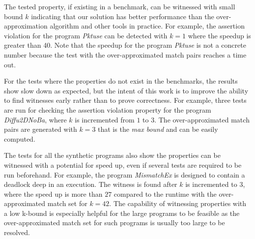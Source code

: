 The tested property, if existing in a benchmark, can be witnessed with small bound $k$ indicating that our solution has better performance than the over-approximation algorithm and other tools in practice. 
For example, the assertion violation for the program \textit{Pktuse} can be detected with $k=1$ where the speedup is greater than 40. Note that the speedup for the program \textit{Pktuse} is not a concrete number because the test with the over-approximated match pairs reaches a time out.


For the tests where the properties do not exist in the benchmarks, the results show slow down as expected, but the intent of this work is to improve the ability to find witnesses early rather than to prove correctness. 
For example, three tests are run for checking the assertion violation property for the program \textit{Diffu2DNoBa}, where $k$ is incremented from $1$ to $3$. 
The over-approximated match pairs are generated with $k=3$ that is the \textit{max bound} and can be easily computed. 

The tests for all the synthetic programs also show the properties can be witnessed with a potential for speed up, even if several tests are required to be run beforehand. For example, the program \textit{MismatchEx} is designed to contain a deadlock deep in an execution. The witness is found after $k$ is incremented to $3$, where the speed up is more than $27$ compared to the runtime with the over-approximated match set for $k=42$. The capability of witnessing properties with a low k-bound is especially helpful for the large programs to be feasible as the over-approximated match set for such programs is usually too large to be resolved.


 


